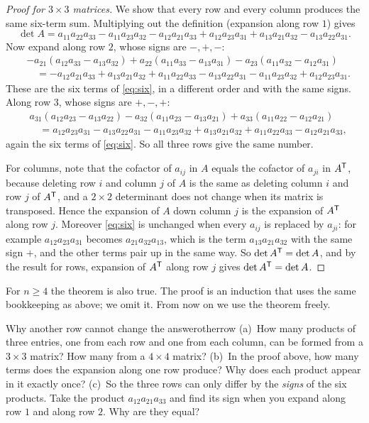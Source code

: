 \documentclass[11pt]{article}
\begin{document}
\begin{proof}[Proof for $3\times3$ matrices]
We show that every row and every column produces the same six-term sum. Multiplying out the definition (expansion along row $1$) gives
\begin{equation}\label{eq:six}
\det A=a_{11}a_{22}a_{33}-a_{11}a_{23}a_{32}-a_{12}a_{21}a_{33}+a_{12}a_{23}a_{31}+a_{13}a_{21}a_{32}-a_{13}a_{22}a_{31}.
\end{equation}
Now expand along row $2$, whose signs are $-,+,-$:
\begin{align*}
&-a_{21}(a_{12}a_{33}-a_{13}a_{32})+a_{22}(a_{11}a_{33}-a_{13}a_{31})-a_{23}(a_{11}a_{32}-a_{12}a_{31})\\
&\quad=-a_{12}a_{21}a_{33}+a_{13}a_{21}a_{32}+a_{11}a_{22}a_{33}-a_{13}a_{22}a_{31}-a_{11}a_{23}a_{32}+a_{12}a_{23}a_{31}.
\end{align*}
These are the six terms of \eqref{eq:six}, in a different order and with the same signs. Along row $3$, whose signs are $+,-,+$:
\begin{align*}
&a_{31}(a_{12}a_{23}-a_{13}a_{22})-a_{32}(a_{11}a_{23}-a_{13}a_{21})+a_{33}(a_{11}a_{22}-a_{12}a_{21})\\
&\quad=a_{12}a_{23}a_{31}-a_{13}a_{22}a_{31}-a_{11}a_{23}a_{32}+a_{13}a_{21}a_{32}+a_{11}a_{22}a_{33}-a_{12}a_{21}a_{33},
\end{align*}
again the six terms of \eqref{eq:six}. So all three rows give the same number.

For columns, note that the cofactor of $a_{ij}$ in $A$ equals the cofactor of $a_{ji}$ in $A^{\mathsf T}$, because deleting row $i$ and column $j$ of $A$ is the same as deleting column $i$ and row $j$ of $A^{\mathsf T}$, and a $2\times2$ determinant does not change when its matrix is transposed. Hence the expansion of $A$ down column $j$ is the expansion of $A^{\mathsf T}$ along row $j$. Moreover \eqref{eq:six} is unchanged when every $a_{ij}$ is replaced by $a_{ji}$: for example $a_{12}a_{23}a_{31}$ becomes $a_{21}a_{32}a_{13}$, which is the term $a_{13}a_{21}a_{32}$ with the same sign $+$, and the other terms pair up in the same way. So $\det A^{\mathsf T}=\det A$, and by the result for rows, expansion of $A^{\mathsf T}$ along row $j$ gives $\det A^{\mathsf T}=\det A$.
\end{proof}

For $n\geq4$ the theorem is also true. The proof is an induction that uses the same bookkeeping as above; we omit it. From now on we use the theorem freely.

\begin{think}{Why another row cannot change the answer}{otherrow}
(a)~How many products of three entries, one from each row and one from each column, can be formed from a $3\times3$ matrix? How many from a $4\times4$ matrix? (b)~In the proof above, how many terms does the expansion along one row produce? Why does each product appear in it exactly once? (c)~So the three rows can only differ by the \emph{signs} of the six products. Take the product $a_{12}a_{21}a_{33}$ and find its sign when you expand along row $1$ and along row $2$. Why are they equal?
\end{think}
\end{document}
